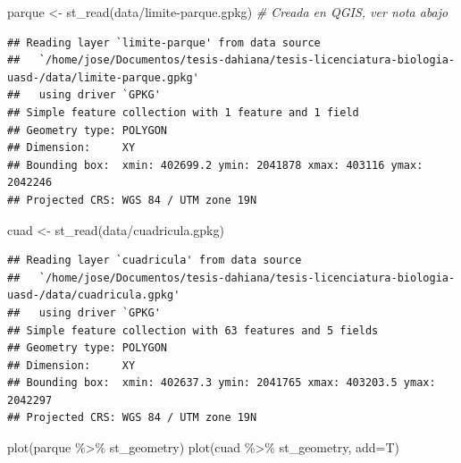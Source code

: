 \documentclass[
  11pt,
]{article}
\newenvironment{Shaded}{\begin{snugshade}}{\end{snugshade}}
\newcommand{\AttributeTok}[1]{\textcolor[rgb]{0.77,0.63,0.00}{#1}}
\newcommand{\CommentTok}[1]{\textcolor[rgb]{0.56,0.35,0.01}{\textit{#1}}}
\newcommand{\FunctionTok}[1]{\textcolor[rgb]{0.00,0.00,0.00}{#1}}
\newcommand{\NormalTok}[1]{#1}
\newcommand{\OtherTok}[1]{\textcolor[rgb]{0.56,0.35,0.01}{#1}}
\newcommand{\SpecialCharTok}[1]{\textcolor[rgb]{0.00,0.00,0.00}{#1}}
\newcommand{\StringTok}[1]{\textcolor[rgb]{0.31,0.60,0.02}{#1}}
\begin{document}
\begin{Shaded}
\begin{Highlighting}[]
\NormalTok{parque }\OtherTok{\textless{}{-}} \FunctionTok{st\_read}\NormalTok{(}\StringTok{\textquotesingle{}data/limite{-}parque.gpkg\textquotesingle{}}\NormalTok{) }\CommentTok{\# Creada en QGIS, ver nota abajo}
\end{Highlighting}
\end{Shaded}

\begin{verbatim}
## Reading layer `limite-parque' from data source 
##   `/home/jose/Documentos/tesis-dahiana/tesis-licenciatura-biologia-uasd-/data/limite-parque.gpkg' 
##   using driver `GPKG'
## Simple feature collection with 1 feature and 1 field
## Geometry type: POLYGON
## Dimension:     XY
## Bounding box:  xmin: 402699.2 ymin: 2041878 xmax: 403116 ymax: 2042246
## Projected CRS: WGS 84 / UTM zone 19N
\end{verbatim}

\begin{Shaded}
\begin{Highlighting}[]
\NormalTok{cuad }\OtherTok{\textless{}{-}} \FunctionTok{st\_read}\NormalTok{(}\StringTok{\textquotesingle{}data/cuadricula.gpkg\textquotesingle{}}\NormalTok{)}
\end{Highlighting}
\end{Shaded}

\begin{verbatim}
## Reading layer `cuadricula' from data source 
##   `/home/jose/Documentos/tesis-dahiana/tesis-licenciatura-biologia-uasd-/data/cuadricula.gpkg' 
##   using driver `GPKG'
## Simple feature collection with 63 features and 5 fields
## Geometry type: POLYGON
## Dimension:     XY
## Bounding box:  xmin: 402637.3 ymin: 2041765 xmax: 403203.5 ymax: 2042297
## Projected CRS: WGS 84 / UTM zone 19N
\end{verbatim}

\begin{Shaded}
\begin{Highlighting}[]
\FunctionTok{plot}\NormalTok{(parque }\SpecialCharTok{\%\textgreater{}\%}\NormalTok{ st\_geometry)}
\FunctionTok{plot}\NormalTok{(cuad }\SpecialCharTok{\%\textgreater{}\%}\NormalTok{ st\_geometry, }\AttributeTok{add=}\NormalTok{T)}
\end{Highlighting}
\end{Shaded}
\end{document}
